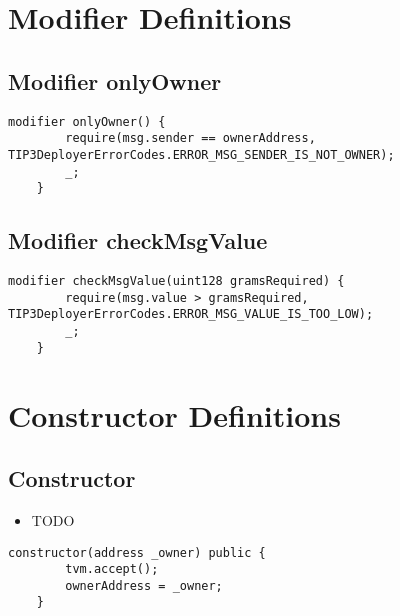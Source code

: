 \section{Modifier Definitions}


\subsection{Modifier onlyOwner}


\begin{lstlisting}[firstnumber=137]
    modifier onlyOwner() {
        require(msg.sender == ownerAddress, TIP3DeployerErrorCodes.ERROR_MSG_SENDER_IS_NOT_OWNER);
        _;
    }
\end{lstlisting}

\subsection{Modifier checkMsgValue}


\begin{lstlisting}[firstnumber=145]
    modifier checkMsgValue(uint128 gramsRequired) {
        require(msg.value > gramsRequired, TIP3DeployerErrorCodes.ERROR_MSG_VALUE_IS_TOO_LOW);
        _;
    }
\end{lstlisting}

\section{Constructor Definitions}


\subsection{Constructor}

\noindent\begin{itemize}
\item TODO
\end{itemize}

\begin{lstlisting}[firstnumber=28]
    constructor(address _owner) public {
        tvm.accept();
        ownerAddress = _owner;
    }
\end{lstlisting}

